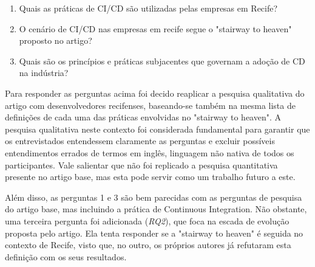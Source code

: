 \begin{enumerate}
\item Quais as práticas de CI/CD são utilizadas pelas empresas em Recife?
\item O cenário de CI/CD nas empresas em recife segue o "stairway to heaven" proposto no artigo?
\item Quais são os princípios e práticas subjacentes que governam a adoção de CD na indústria?
\end{enumerate}

Para responder as perguntas acima foi decido reaplicar a pesquisa qualitativa do artigo \cite{empiricalStudy2016} com desenvolvedores recifenses, baseando-se também na mesma lista de definições de cada uma das práticas envolvidas no "stairway to heaven". A pesquisa qualitativa neste contexto foi considerada fundamental para garantir que os entrevistados entendessem claramente as perguntas e excluir possíveis entendimentos errados de termos em inglês, linguagem não nativa de todos os participantes. Vale salientar que não foi replicado a pesquisa quantitativa presente no artigo base, mas esta pode servir como um trabalho futuro a este.

Além disso, as perguntas 1 e 3 são bem parecidas com as perguntas de pesquisa do artigo base, mas incluindo a prática de Continuous Integration. Não obstante, uma terceira pergunta foi adicionada (\emph{RQ2}), que foca na escada de evolução proposta pelo artigo. Ela tenta responder se a "stairway to heaven" é seguida no contexto de Recife, visto que, no outro, os próprios autores já refutaram esta definição com os seus resultados.


